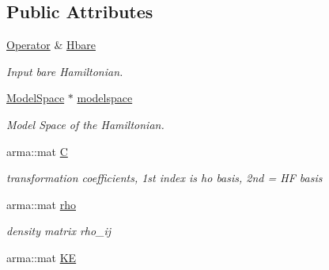 \subsection*{Public Attributes}
\begin{DoxyCompactItemize}
\item 
\hypertarget{classHartreeFock_aad1a5eeadedf9689bbfc2e3d71b60aee}{\hyperlink{classOperator}{Operator} \& \hyperlink{classHartreeFock_aad1a5eeadedf9689bbfc2e3d71b60aee}{Hbare}}\label{classHartreeFock_aad1a5eeadedf9689bbfc2e3d71b60aee}

\begin{DoxyCompactList}\small\item\em Input bare Hamiltonian. \end{DoxyCompactList}\item 
\hypertarget{classHartreeFock_a5d4a6814a338d7e4c17575ac74763f30}{\hyperlink{classModelSpace}{Model\-Space} $\ast$ \hyperlink{classHartreeFock_a5d4a6814a338d7e4c17575ac74763f30}{modelspace}}\label{classHartreeFock_a5d4a6814a338d7e4c17575ac74763f30}

\begin{DoxyCompactList}\small\item\em Model Space of the Hamiltonian. \end{DoxyCompactList}\item 
\hypertarget{classHartreeFock_a9c73247cdb9255cebabaacc99ec55086}{arma\-::mat \hyperlink{classHartreeFock_a9c73247cdb9255cebabaacc99ec55086}{C}}\label{classHartreeFock_a9c73247cdb9255cebabaacc99ec55086}

\begin{DoxyCompactList}\small\item\em transformation coefficients, 1st index is ho basis, 2nd = H\-F basis \end{DoxyCompactList}\item 
\hypertarget{classHartreeFock_a6fc0aa9f25640979d5188443a19aeea5}{arma\-::mat \hyperlink{classHartreeFock_a6fc0aa9f25640979d5188443a19aeea5}{rho}}\label{classHartreeFock_a6fc0aa9f25640979d5188443a19aeea5}

\begin{DoxyCompactList}\small\item\em density matrix rho\-\_\-ij \end{DoxyCompactList}\item 
\hypertarget{classHartreeFock_aa30fe3bd6fa480cc21b85a830013c9fe}{arma\-::mat \hyperlink{classHartreeFock_aa30fe3bd6fa480cc21b85a830013c9fe}{K\-E}}\label{classHartreeFock_aa30fe3bd6fa480cc21b85a830013c9fe}


\end{DoxyCompactItemize}
